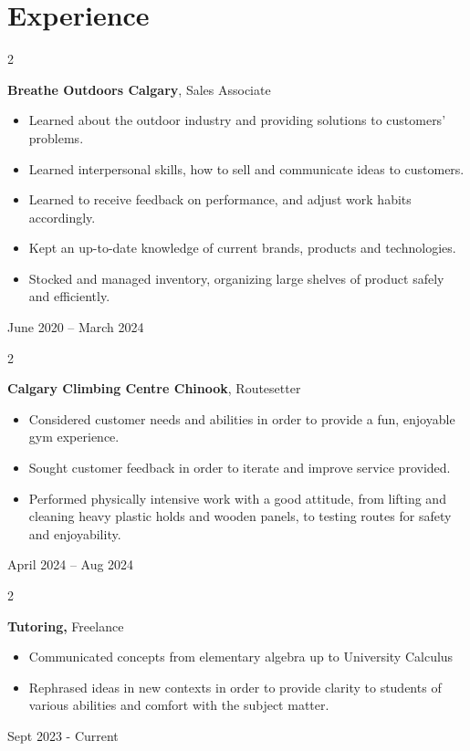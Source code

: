\documentclass[10pt, letterpaper]{article}
\newenvironment{highlights}{
    \begin{itemize}[
        topsep=0.10 cm,
        parsep=0.10 cm,
        partopsep=0pt,
        itemsep=0pt,
        leftmargin=0.4 cm + 10pt
    ]
}{
    \end{itemize}
} %
\newenvironment{twocolentry}[2][]{
    \onecolentry
    \def\secondColumn{#2}
    \setcolumnwidth{\fill, 4.5 cm}
    \begin{paracol}{2}
}{
    \switchcolumn \raggedleft \secondColumn
    \end{paracol}
    \endonecolentry
} %
\begin{document}
    \section{Experience}
        
        \begin{twocolentry}{
        June 2020 – March 2024
        }
            \textbf{Breathe Outdoors Calgary}, Sales Associate
            \begin{highlights}
                \item Learned about the outdoor industry and providing solutions to customers' problems.
                \item Learned interpersonal skills, how to sell and communicate ideas to customers.
                \item Learned to receive feedback on performance, and adjust work habits accordingly.
                \item Kept an up-to-date knowledge of current brands, products and technologies.
                \item Stocked and managed inventory, organizing large shelves of product safely and efficiently.
            \end{highlights}
        \end{twocolentry}

        \vspace{0.2 cm}

        \begin{twocolentry}{
        April 2024 – Aug 2024
        }
            \textbf{Calgary Climbing Centre Chinook}, Routesetter
            \begin{highlights}
                \item Considered customer needs and abilities in order to provide a fun, enjoyable gym experience.
                \item Sought customer feedback in order to iterate and improve service provided.
                \item Performed physically intensive work with a good attitude, from lifting and cleaning heavy plastic holds and wooden panels, to testing routes for safety and enjoyability.
            \end{highlights}
        \end{twocolentry}
        \begin{twocolentry}{
                Sept 2023 - Current
            }

            \textbf{Tutoring, }Freelance
            \begin{highlights}
            \item Communicated concepts from elementary algebra up to University Calculus
            \item Rephrased ideas in new contexts in order to provide clarity to students of various abilities and comfort with the subject matter.
            \end{highlights}
        \end{twocolentry}
    
\end{document}
